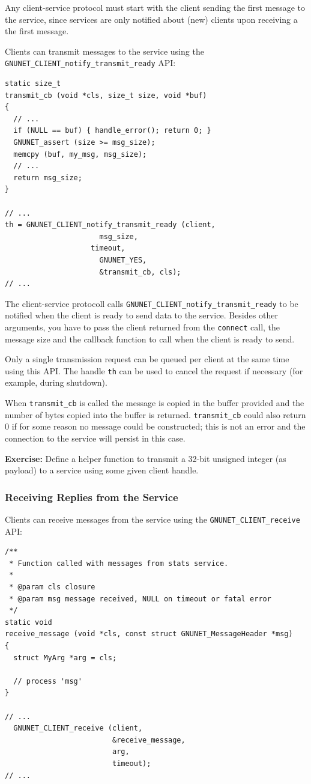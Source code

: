 \documentclass[10pt]{article}
\newcommand{\exercise}[1]{\noindent\begin{boxedminipage}{\textwidth}{\bf Exercise:} #1 \end{boxedminipage}}
\begin{document}
Any client-service protocol must start with the client sending the
first message to the service, since services are only notified about
(new) clients upon receiving a the first message.

Clients can transmit messages to the service using the
{\tt GNUNET\_CLIENT\_notify\_transmit\_ready} API:
\lstset{language=c}
\begin{lstlisting}
static size_t
transmit_cb (void *cls, size_t size, void *buf)
{
  // ...
  if (NULL == buf) { handle_error(); return 0; }
  GNUNET_assert (size >= msg_size);
  memcpy (buf, my_msg, msg_size);
  // ...
  return msg_size;
}

// ...	
th = GNUNET_CLIENT_notify_transmit_ready (client,
					  msg_size,
 				    timeout,
					  GNUNET_YES,
					  &transmit_cb, cls);
// ...
\end{lstlisting}

The client-service protocoll calls {\tt GNUNET\_CLIENT\_notify\_transmit\_ready}
to be notified when the client is ready to send data to the service. 
Besides other arguments, you have to pass the client returned 
from the {\tt connect} call, the message size and the callback function to 
call when the client is ready to send. 

Only a single transmission request can be queued per client at the
same time using this API.  The handle {\tt th} can be used to cancel
the request if necessary (for example, during shutdown).  

When {\tt transmit\_cb} is called the message is copied in the buffer provided and 
the number of bytes copied into the buffer is returned. {\tt transmit\_cb} 
could also return 0 if for some reason no message
could be constructed; this is not an error and the connection to the
service will persist in this case.

\exercise{Define a helper function to transmit a 32-bit
unsigned integer (as payload) to a service using some given client
handle.}


\subsubsection{Receiving Replies from the Service}

Clients can receive messages from the service using the
{\tt GNUNET\_CLIENT\_receive} API:

\lstset{language=c}
\begin{lstlisting}
/**
 * Function called with messages from stats service.
 *
 * @param cls closure
 * @param msg message received, NULL on timeout or fatal error
 */
static void
receive_message (void *cls, const struct GNUNET_MessageHeader *msg)
{
  struct MyArg *arg = cls;

  // process 'msg'
}

// ... 
  GNUNET_CLIENT_receive (client,
                         &receive_message,
                         arg,
                         timeout);
// ...
\end{lstlisting}
\end{document}
